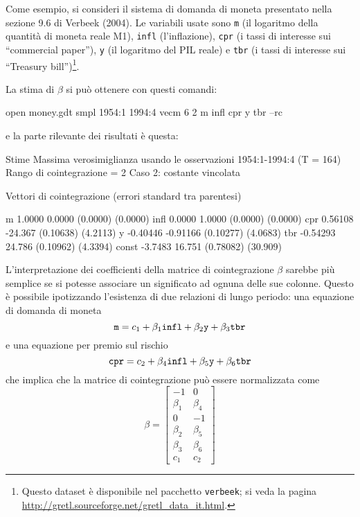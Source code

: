 Come esempio, si consideri il sistema di domanda di moneta presentato nella
sezione 9.6 di Verbeek (2004). Le variabili usate sono \texttt{m} (il logaritmo
della quantità di moneta reale M1), \texttt{infl} (l'inflazione), \texttt{cpr}
(i tassi di interesse sui ``commercial paper''), \texttt{y} (il logaritmo del
PIL reale) e \texttt{tbr} (i tassi di interesse sui ``Treasury bill'')\footnote{Questo
dataset è disponibile nel pacchetto \texttt{verbeek}; si veda la pagina
  \url{http://gretl.sourceforge.net/gretl_data_it.html}.}.

La stima di $\beta$ si può ottenere con questi comandi:
\begin{code}
  open money.gdt 
  smpl 1954:1 1994:4 
  vecm 6 2 m infl cpr y tbr --rc
\end{code}
e la parte rilevante dei risultati è questa:
\begin{code}
Stime Massima verosimiglianza usando le osservazioni 1954:1-1994:4 (T = 164)
Rango di cointegrazione = 2
Caso 2: costante vincolata

Vettori di cointegrazione (errori standard tra parentesi)

m           1.0000       0.0000 
           (0.0000)     (0.0000) 
infl        0.0000       1.0000 
           (0.0000)     (0.0000) 
cpr        0.56108      -24.367 
          (0.10638)     (4.2113) 
y         -0.40446     -0.91166 
          (0.10277)     (4.0683) 
tbr       -0.54293       24.786 
          (0.10962)     (4.3394) 
const      -3.7483       16.751 
          (0.78082)     (30.909) 
\end{code}
L'interpretazione dei coefficienti della matrice di cointegrazione $\beta$
sarebbe più semplice se si potesse associare un significato ad ognuna delle sue
colonne. Questo è possibile ipotizzando l'esistenza di due relazioni di lungo
periodo: una equazione di domanda di moneta
\begin{equation}
  \label{eq:verbeek-mondem}
  \mbox{\tt m} = c_1 + \beta_1 \mbox{\tt infl} + \beta_2 \mbox{\tt
    y} + \beta_3 \mbox{\tt tbr}
\end{equation}
e una equazione per premio sul rischio
\begin{equation}
  \label{eq:verbeek-premium}
 \mbox{\tt cpr} = c_2 + \beta_4 \mbox{\tt infl} +
   \beta_5 \mbox{\tt y} + \beta_6 \mbox{\tt tbr}
\end{equation}
che implica che la matrice di cointegrazione può essere normalizzata come
\[
  \beta = \left[
    \begin{array}{rr}
      -1 & 0 \\ \beta_1 & \beta_4 \\ 0 & -1 \\ \beta_2 & \beta_5
      \\ \beta_3 & \beta_6 \\ c_1 & c_2
    \end{array}
    \right]
\]

